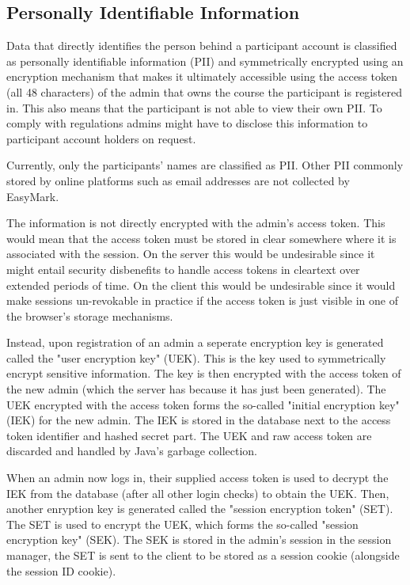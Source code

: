 \documentclass[12pt,a4paper,oneside]{report}
\begin{document}
	\subsection{Personally Identifiable Information}
	Data that directly identifies the person behind a participant account is classified as personally identifiable information (PII) and symmetrically encrypted using an encryption mechanism that makes it ultimately accessible using the access token (all 48 characters) of the admin that owns the course the participant is registered in. This also means that the participant is not able to view their own PII. To comply with regulations admins might have to disclose this information to participant account holders on request.

	Currently, only the participants' names are classified as PII. Other PII commonly stored by online platforms such as email addresses are not collected by EasyMark.

	The information is not directly encrypted with the admin's access token. This would mean that the access token must be stored in clear somewhere where it is associated with the session. On the server this would be undesirable since it might entail security disbenefits to handle access tokens in cleartext over extended periods of time. On the client this would be undesirable since it would make sessions un-revokable in practice if the access token is just visible in one of the browser's storage mechanisms.

	Instead, upon registration of an admin a seperate encryption key is generated called the "user encryption key" (UEK). This is the key used to symmetrically encrypt sensitive information. The key is then encrypted with the access token of the new admin (which the server has because it has just been generated). The UEK encrypted with the access token forms the so-called "initial encryption key" (IEK) for the new admin. The IEK is stored in the database next to the access token identifier and hashed secret part. The UEK and raw access token are discarded and handled by Java's garbage collection.

	When an admin now logs in, their supplied access token is used to decrypt the IEK from the database (after all other login checks) to obtain the UEK. Then, another enryption key is generated called the "session encryption token" (SET). The SET is used to encrypt the UEK, which forms the so-called "session encryption key" (SEK). The SEK is stored in the admin's session in the session manager, the SET is sent to the client to be stored as a session cookie (alongside the session ID cookie).
\end{document}
